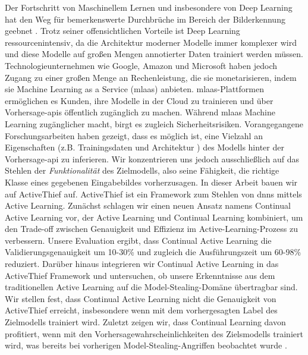 
\Abstract
Der Fortschritt von Maschinellem Lernen und insbesondere von Deep Learning hat den Weg für bemerkenswerte Durchbrüche im Bereich der Bilderkennung geebnet
\parencite{goodfellow2020generative,he2016deep,lecun1989backpropagation}. Trotz seiner offensichtlichen Vorteile ist Deep Learning ressourcenintensiv, da
die Architektur moderner Modelle immer komplexer wird und diese Modelle auf großen Mengen annotierter Daten trainiert werden müssen. Technologieunternehmen wie Google,
Amazon und Microsoft haben jedoch Zugang zu einer großen Menge an Rechenleistung, die sie monetarisieren, indem sie Machine Learning as a Service (\gls{mlaas}) anbieten.
\gls{mlaas}-Plattformen ermöglichen es Kunden, ihre Modelle in der Cloud zu trainieren und über Vorhersage-\glspl{api} öffentlich zugänglich zu machen.
Während \gls{mlaas} Machine Learning zugänglicher macht, birgt es zugleich Sicherheitsrisiken. Vorangegangene Forschungsarbeiten haben gezeigt, dass es möglich ist,
eine Vielzahl an Eigenschaften (z.B. Trainingsdaten \cite{shokri2017membership} und Architektur \cite{oh2019towards}) des Modells hinter der Vorhersage-\gls{api}
\parencite{papernot2017practical,tramer2016stealing} zu inferieren. Wir konzentrieren uns jedoch ausschließlich auf das Stehlen der \textit{Funktionalität} des Zielmodells,
also seine Fähigkeit, die richtige Klasse eines gegebenen Eingabebildes vorherzusagen. In dieser Arbeit bauen wir auf ActiveThief \cite{pal2020activethief} auf. ActiveThief
ist ein Framework zum Stehlen von \glspl{dnn} mittels Active Learning. Zunächst schlagen wir einen neuen Ansatz namens Continual Active Learning vor, der Active Learning
und Continual Learning kombiniert, um den Trade-off zwischen Genauigkeit und Effizienz im Active-Learning-Prozess zu verbessern. Unsere Evaluation ergibt, dass Continual
Active Learning die Validierungsgenauigkeit um 10-30\% und zugleich die Ausführungszeit um 60-98\% reduziert. Darüber hinaus integrieren wir Continual Active Learning in
das ActiveThief Framework und untersuchen, ob unsere Erkenntnisse aus dem traditionellen Active Learning auf die Model-Stealing-Domäne übertragbar sind. Wir stellen fest,
dass Continual Active Learning nicht die Genauigkeit von ActiveThief erreicht, insbesondere wenn mit dem vorhergesagten Label des Zielmodells trainiert wird. Zuletzt zeigen wir,
dass Continual Learning davon profitiert, wenn mit den Vorhersagewahrscheinlichkeiten des Zielsmodells trainiert wird, was bereits bei vorherigen Model-Stealing-Angriffen
beobachtet wurde \parencite{orekondy2019knockoff,pal2020activethief}.
